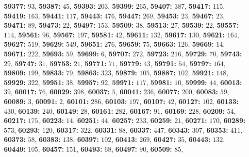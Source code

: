 \textsf{\bfseries 59377:} $93$, \textsf{\bfseries 59387:} $45$, \textsf{\bfseries 59393:} $203$, \textsf{\bfseries 59399:} $265$, \textsf{\bfseries 59407:} $387$, \textsf{\bfseries 59417:} $115$, \textsf{\bfseries 59419:} $163$, \textsf{\bfseries 59441:} $117$, \textsf{\bfseries 59443:} $476$, \textsf{\bfseries 59447:} $269$, \textsf{\bfseries 59453:} $23$, \textsf{\bfseries 59467:} $23$, \textsf{\bfseries 59471:} $89$, \textsf{\bfseries 59473:} $22$, \textsf{\bfseries 59497:} $153$, \textsf{\bfseries 59509:} $38$, \textsf{\bfseries 59513:} $27$, \textsf{\bfseries 59539:} $22$, \textsf{\bfseries 59557:} $114$, \textsf{\bfseries 59561:} $96$, \textsf{\bfseries 59567:} $197$, \textsf{\bfseries 59581:} $42$, \textsf{\bfseries 59611:} $132$, \textsf{\bfseries 59617:} $130$, \textsf{\bfseries 59621:} $164$, \textsf{\bfseries 59627:} $519$, \textsf{\bfseries 59629:} $549$, \textsf{\bfseries 59651:} $276$, \textsf{\bfseries 59659:} $75$, \textsf{\bfseries 59663:} $126$, \textsf{\bfseries 59669:} $14$, \textsf{\bfseries 59671:} $222$, \textsf{\bfseries 59693:} $59$, \textsf{\bfseries 59699:} $6$, \textsf{\bfseries 59707:} $272$, \textsf{\bfseries 59723:} $216$, \textsf{\bfseries 59729:} $70$, \textsf{\bfseries 59743:} $29$, \textsf{\bfseries 59747:} $31$, \textsf{\bfseries 59753:} $21$, \textsf{\bfseries 59771:} $71$, \textsf{\bfseries 59779:} $43$, \textsf{\bfseries 59791:} $54$, \textsf{\bfseries 59797:} $164$, \textsf{\bfseries 59809:} $199$, \textsf{\bfseries 59833:} $79$, \textsf{\bfseries 59863:} $323$, \textsf{\bfseries 59879:} $105$, \textsf{\bfseries 59887:} $102$, \textsf{\bfseries 59921:} $148$, \textsf{\bfseries 59929:} $322$, \textsf{\bfseries 59951:} $38$, \textsf{\bfseries 59957:} $92$, \textsf{\bfseries 59971:} $117$, \textsf{\bfseries 59981:} $10$, \textsf{\bfseries 59999:} $44$, \textsf{\bfseries 60013:} $39$, \textsf{\bfseries 60017:} $76$, \textsf{\bfseries 60029:} $398$, \textsf{\bfseries 60037:} $5$, \textsf{\bfseries 60041:} $236$, \textsf{\bfseries 60077:} $200$, \textsf{\bfseries 60083:} $59$, \textsf{\bfseries 60089:} $3$, \textsf{\bfseries 60091:} $2$, \textsf{\bfseries 60101:} $286$, \textsf{\bfseries 60103:} $197$, \textsf{\bfseries 60107:} $42$, \textsf{\bfseries 60127:} $102$, \textsf{\bfseries 60133:} $430$, \textsf{\bfseries 60139:} $240$, \textsf{\bfseries 60149:} $28$, \textsf{\bfseries 60161:} $282$, \textsf{\bfseries 60167:} $91$, \textsf{\bfseries 60169:} $228$, \textsf{\bfseries 60209:} $54$, \textsf{\bfseries 60217:} $175$, \textsf{\bfseries 60223:} $14$, \textsf{\bfseries 60251:} $44$, \textsf{\bfseries 60257:} $233$, \textsf{\bfseries 60259:} $21$, \textsf{\bfseries 60271:} $170$, \textsf{\bfseries 60289:} $573$, \textsf{\bfseries 60293:} $120$, \textsf{\bfseries 60317:} $322$, \textsf{\bfseries 60331:} $88$, \textsf{\bfseries 60337:} $447$, \textsf{\bfseries 60343:} $307$, \textsf{\bfseries 60353:} $411$, \textsf{\bfseries 60373:} $58$, \textsf{\bfseries 60383:} $138$, \textsf{\bfseries 60397:} $102$, \textsf{\bfseries 60413:} $269$, \textsf{\bfseries 60427:} $35$, \textsf{\bfseries 60443:} $132$, \textsf{\bfseries 60449:} $105$, \textsf{\bfseries 60457:} $151$, \textsf{\bfseries 60493:} $68$, \textsf{\bfseries 60497:} $90$, \textsf{\bfseries 60509:} $85$, 
